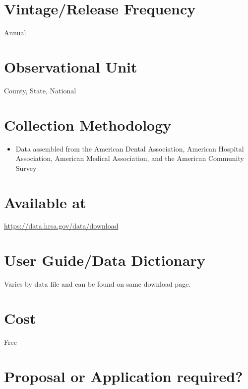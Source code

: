 \documentclass[
]{book}
\providecommand{\tightlist}{%
  \setlength{\itemsep}{0pt}\setlength{\parskip}{0pt}}
\begin{document}
\hypertarget{vintagerelease-frequency-10}{%
\section{Vintage/Release Frequency}\label{vintagerelease-frequency-10}}

Annual

\hypertarget{observational-unit-10}{%
\section{Observational Unit}\label{observational-unit-10}}

County, State, National

\hypertarget{collection-methodology-10}{%
\section{Collection Methodology}\label{collection-methodology-10}}

\begin{itemize}
\tightlist
\item
  Data assembled from the American Dental Association, American Hospital Association, American Medical Association, and the American Community Survey
\end{itemize}

\hypertarget{available-at-10}{%
\section{Available at}\label{available-at-10}}

\url{https://data.hrsa.gov/data/download}

\hypertarget{user-guidedata-dictionary-10}{%
\section{User Guide/Data Dictionary}\label{user-guidedata-dictionary-10}}

Varies by data file and can be found on same download page.

\hypertarget{cost-10}{%
\section{Cost}\label{cost-10}}

Free

\hypertarget{proposal-or-application-required-10}{%
\section{Proposal or Application required?}\label{proposal-or-application-required-10}}
\end{document}
